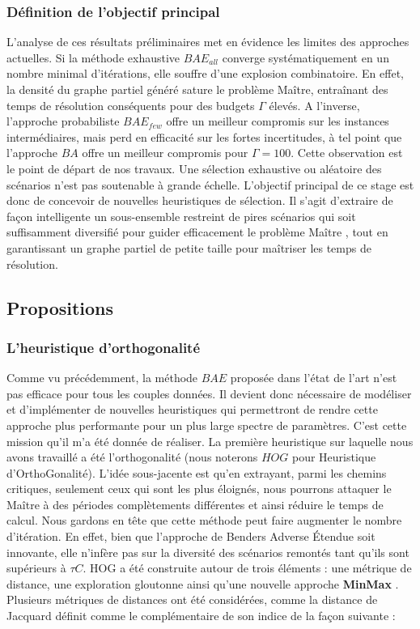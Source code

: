 \documentclass[12pt, a4paper, twoside]{report}
\numberwithin{equation}{section}
\newcommand{\mmx}{\textbf{MinMax} }
\begin{document}
\begin{Figure}[H]
	\subsubsection{Définition de l'objectif principal}
	
	L'analyse de ces résultats préliminaires met en évidence les limites des approches actuelles. Si la méthode exhaustive $BAE_{all}$ converge systématiquement en un nombre minimal d'itérations, elle souffre d'une explosion combinatoire. En effet, la densité du graphe partiel généré sature le problème Maître, entraînant des temps de résolution conséquents pour des budgets $\Gamma$ élevés. A l'inverse, l'approche probabiliste $BAE_{few}$ offre un meilleur compromis sur les instances intermédiaires, mais perd en efficacité sur les fortes incertitudes, à tel point que l'approche $BA$ offre un meilleur compromis pour $\Gamma=100$. Cette observation est le point de départ de nos travaux. Une sélection exhaustive ou aléatoire des scénarios n'est pas soutenable à grande échelle. L'objectif principal de ce stage est donc de concevoir de nouvelles heuristiques de sélection. Il s'agit d'extraire de façon intelligente un sous-ensemble restreint de pires scénarios qui soit suffisamment diversifié pour guider efficacement le problème Maître , tout en garantissant un graphe partiel de petite taille pour maîtriser les temps de résolution.
	
	\subsection{Propositions}
	
	\subsubsection{L'heuristique d'orthogonalité}
	
	Comme vu précédemment, la méthode $BAE$ proposée dans l'état de l'art n'est pas efficace pour tous les couples données. Il devient donc nécessaire de modéliser et d'implémenter de nouvelles heuristiques qui permettront de rendre cette approche plus performante pour un plus large spectre de paramètres. C'est cette mission qu'il m'a été donnée de réaliser. La première heuristique sur laquelle nous avons travaillé a été l'orthogonalité (nous noterons $HOG$ pour Heuristique d'OrthoGonalité).
	L'idée sous-jacente est qu'en extrayant, parmi les chemins critiques, seulement ceux qui sont les plus éloignés, nous pourrons attaquer le Maître à des périodes complètements différentes et ainsi réduire le temps de calcul. Nous gardons en tête que cette méthode peut faire augmenter le nombre d'itération. En effet, bien que l'approche de Benders Adverse Étendue soit innovante, elle n'infère pas sur la diversité des scénarios remontés tant qu'ils sont supérieurs à $\tau C$.
	HOG a été construite autour de trois éléments : une métrique de distance, une exploration gloutonne ainsi qu'une nouvelle approche \mmx. Plusieurs métriques de distances ont été considérées, comme la distance de Jacquard définit comme le complémentaire de son indice de la façon suivante :
	

\end{Figure}
\end{document}
